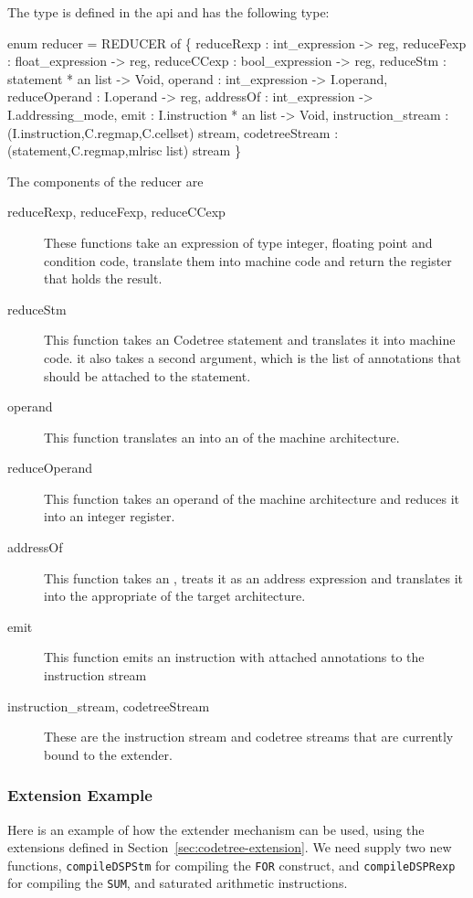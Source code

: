 The  type is defined
in the api  and has the
following type:
\begin{SML}
  enum reducer =
    REDUCER of
    \{ reduceRexp    : int_expression -> reg,
      reduceFexp    : float_expression -> reg,
      reduceCCexp   : bool_expression -> reg,
      reduceStm     : statement * an list -> Void,
      operand       : int_expression -> I.operand,
      reduceOperand : I.operand -> reg,
      addressOf     : int_expression -> I.addressing_mode,
      emit          : I.instruction * an list -> Void,
      instruction_stream   : (I.instruction,C.regmap,C.cellset) stream,
      codetreeStream  : (statement,C.regmap,mlrisc list) stream
    \}
\end{SML}

The components of the reducer are
\begin{description}
  \item[reduceRexp, reduceFexp, reduceCCexp] These functions 
take an expression of type integer, floating point and condition code, 
translate them into machine code and return the 
register that holds the result. 
  \item[reduceStm] This function takes an Codetree statement and translates
it into machine code.  it also takes a second argument, which is the
list of annotations that should be attached to the statement.
  \item[operand] This function translates an  into an
  of the machine architecture.
  \item[reduceOperand] This function takes an operand of the machine
architecture and reduces it into an integer register.
  \item[addressOf] This function takes an , treats
it as an address expression and translates it into the appropriate
 of the target architecture.
  \item[emit]  This function emits an instruction with attached annotations
to the instruction stream
  \item[instruction_stream, codetreeStream]  These are the instruction stream
and codetree streams that are currently bound to the extender.
\end{description}

\subsubsection{Extension Example}
Here is an example of how the extender mechanism can be used,
using the  extensions defined in
Section~\ref{sec:codetree-extension}.   We need supply two
new functions, \verb|compileDSPStm| for compiling the \verb|FOR|
construct, and \verb|compileDSPRexp| for compiling the \verb|SUM|,
and saturated arithmetic instructions.

